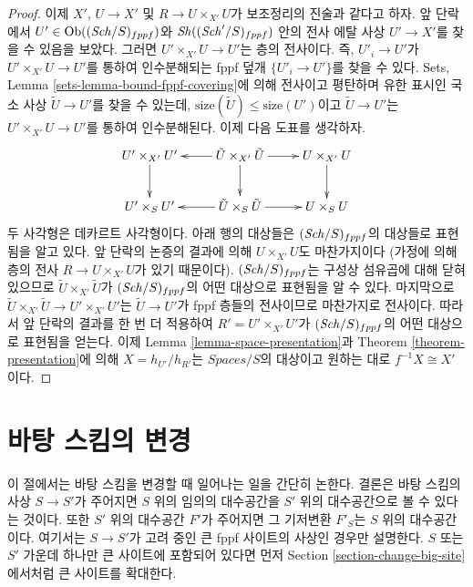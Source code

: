 \begin{proof}
\medskip\noindent
이제 $X'$, $U \to X'$ 및 $R \to U \times_{X'} U$가 보조정리의
진술과 같다고 하자. 앞 단락에서
$U' \in \mathop{\mathrm{Ob}}\nolimits((\mathit{Sch}/S)_{fppf})$와 $\mathop{\mathit{Sh}}\nolimits((\mathit{Sch}'/S)_{fppf})$ 안의
전사 에탈 사상 $U' \to X'$를 찾을 수 있음을 보았다.
그러면 $U' \times_{X'} U \to U'$는 층의 전사이다. 즉,
$U'_i \to U'$가 $U' \times_{X'} U \to U'$를 통하여 인수분해되는
fppf 덮개 $\{U'_i \to U'\}$를 찾을 수 있다.
Sets, Lemma \ref{sets-lemma-bound-fppf-covering}에 의해
전사이고 평탄하며 유한 표시인 국소 사상
$\tilde U \to U'$를 찾을 수 있는데,
$\text{size}(\tilde U) \leq \text{size}(U')$이고
$\tilde U \to U'$는 $U' \times_{X'} U \to U'$를 통하여
인수분해된다. 이제 다음 도표를 생각하자.
$$
\xymatrix{
U' \times_{X'} U' \ar[d] &
\tilde U \times_{X'} \tilde U  \ar[l] \ar[d] \ar[r] &
U \times_{X'} U \ar[d] \\
U' \times_S U' & \tilde U \times_S \tilde U \ar[l] \ar[r] & U \times_S U
}
$$
두 사각형은 데카르트 사각형이다. 아래 행의 대상들은
$(\mathit{Sch}/S)_{fppf}$의 대상들로 표현됨을 알고 있다. 앞 단락의 논증의
결과에 의해 $U \times_{X'} U$도 마찬가지이다
(가정에 의해 층의 전사 $R \to U \times_{X'} U$가 있기 때문이다).
$(\mathit{Sch}/S)_{fppf}$는 구성상 섬유곱에 대해 닫혀 있으므로
$\tilde U \times_{X'} \tilde U$가 $(\mathit{Sch}/S)_{fppf}$의 어떤
대상으로 표현됨을 알 수 있다. 마지막으로
$\tilde U \times_{X'} \tilde U \to U' \times_{X'} U'$는
$\tilde U \to U'$가 fppf 층들의 전사이므로 마찬가지로 전사이다.
따라서 앞 단락의 결과를 한 번 더 적용하여
$R' = U' \times_{X'} U'$가 $(\mathit{Sch}/S)_{fppf}$의 어떤 대상으로
표현됨을 얻는다. 이제 Lemma \ref{lemma-space-presentation}과
Theorem \ref{theorem-presentation}에 의해
$X = h_{U'}/h_{R'}$는 $\textit{Spaces}/S$의 대상이고
원하는 대로 $f^{-1}X \cong X'$이다.
\end{proof}

\section{바탕 스킴의 변경}
\label{section-change-base-scheme}

\noindent
이 절에서는 바탕 스킴을 변경할 때 일어나는 일을 간단히 논한다.
결론은 바탕 스킴의 사상 $S \to S'$가 주어지면 $S$ 위의 임의의
대수공간을 $S'$ 위의 대수공간으로 볼 수 있다는 것이다. 또한
$S'$ 위의 대수공간 $F'$가 주어지면 그 기저변환 $F'_S$는
$S$ 위의 대수공간이다.
여기서는 $S \to S'$가 고려 중인 큰 fppf 사이트의 사상인 경우만
설명한다. $S$ 또는 $S'$ 가운데 하나만 큰 사이트에 포함되어 있다면
먼저 Section \ref{section-change-big-site}에서처럼 큰 사이트를
확대한다.

